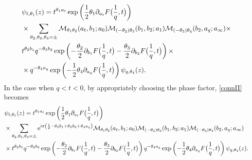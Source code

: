 \documentclass[11pt]{article}
\numberwithin{equation}{section}
\newcommand{\ri}{{\rm i}}
\newcommand{\E}{{\mathrm e}}
\begin{document}
\begin{equation}\label{connII}
\begin{aligned}
&\psi_{t,\theta_1}(z)=t^{\theta_1 a_t}\exp\left(\frac{1}{2}\theta_1\partial_{a_t}F\big({1\over q},t\big)\right)\\
&\times\sum_{\theta_2,\theta_3,\theta_4=\pm}\mathcal{M}_{\theta_1\theta_2}(a_t,b_1;a_0)\mathcal{M}_{(-\theta_2)\theta_3}(b_1,b_2;a_1)\mathcal{M}_{(-\theta_3)\theta_4}(b_2,a_{q};a_{\infty})\times\\
&t^{\theta_2b_1}q^{-\theta_3b_2}\exp\left(-\frac{\theta_2}{2}\partial_{b_1}F\big({1\over q},t\big)-\frac{\theta_3}{2}\partial_{b_2}F\big({1\over q},t\big)\right)\times\\
&\times q^{-\theta_4 a_q}\exp\left(-\frac{1}{2}\theta_4\partial_{a_q}F\big({1\over q},t\big)\right)\psi_{q,\theta_4}(z).
\end{aligned}
\end{equation}
%
%
In the case when $q<t<0$, by appropriately choosing the phase factor,  \eqref{connII} becomes
\begin{equation}
\label{conn2eqn}
\begin{aligned}
&\psi_{t,\theta_1}(z) = t^{\theta_1 a_t}\exp\left(\frac{1}{2}\theta_1\partial_{a_t}F\big({1\over q},t\big)\right)\\
&\times \sum_{\theta_2,\theta_3,\theta_4=\pm} \E^{\ri\pi\left(\frac{1}{2} - \theta_2 b_1 + \theta_3 b_2 + \theta_4 a_q\right)}
\mathcal{M}_{\theta_1\theta_2}(a_t, b_1; a_0) 
\mathcal{M}_{(-\theta_2)\theta_3}(b_1, b_2; a_1) 
\mathcal{M}_{(-\theta_3)\theta_4}(b_2, a_q; a_{\infty}) \\
&\times t^{\theta_2 b_1} q^{-\theta_3 b_2} 
\exp\left(-\frac{\theta_2}{2}\partial_{b_1}F\big({1\over q},t\big) 
-\frac{\theta_3}{2}\partial_{b_2}F\big({1\over q},t\big)\right)  q^{-\theta_4 a_q} 
\exp\left(-\frac{1}{2}\theta_4\partial_{a_q}F\big({1\over q},t\big)\right)
\psi_{q,\theta_4}(z).
\end{aligned}
\end{equation}
%
\end{document}
